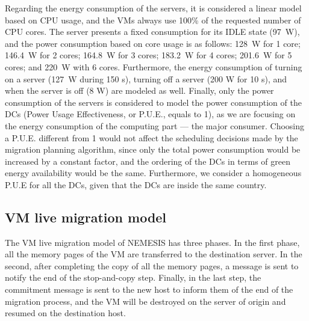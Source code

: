 Regarding the energy consumption of the servers, it is considered a linear model based on CPU usage, and the VMs always use 100\% of the requested number of CPU cores. The server presents a fixed consumption for its IDLE state (97~W), and the power consumption based on core usage is as follows: 128~W for 1 core; 146.4~W for 2 cores; 164.8~W for 3 cores; 183.2~W for 4 cores; 201.6~W for 5 cores; and 220~W with 6 cores. Furthermore, the energy consumption of turning on a server (127~W during 150 s), turning off a server (200 W for 10 s), and when the server is off (8 W) are modeled as well. Finally, only the power consumption of the servers is considered to model the power consumption of the DCs (Power Usage Effectiveness, or P.U.E., equals to 1), as we are focusing on the energy consumption of the computing part --- the major consumer. Choosing a P.U.E. different from 1 would not affect the scheduling decisions made by the migration planning algorithm, since only the total power consumption would be increased by a constant factor, and the ordering of the DCs in terms of green energy availability would be the same. Furthermore, we consider a homogeneous P.U.E for all the DCs, given that the DCs are inside the same country.

\subsection{VM live migration model}

The VM live migration model of NEMESIS has three phases. In the first phase, all the memory pages of the VM are transferred to the destination server. In the second, after completing the copy of all the memory pages, a message is sent to notify the end of the stop-and-copy step. Finally, in the last step, the commitment message is sent to the new host to inform them of the end of the migration process, and the VM will be destroyed on the server of origin and resumed on the destination host.

